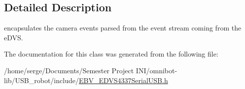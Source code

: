 \subsection{Detailed Description}
encapsulates the camera events parsed from the event stream coming from the e\+D\+V\+S. 

The documentation for this class was generated from the following file\+:\begin{DoxyCompactItemize}
\item 
/home/serge/\+Documents/\+Semester Project I\+N\+I/omnibot-\/lib/\+U\+S\+B\+\_\+robot/include/\hyperlink{_e_b_v___e_d_v_s4337_serial_u_s_b_8h}{E\+B\+V\+\_\+\+E\+D\+V\+S4337\+Serial\+U\+S\+B.\+h}\end{DoxyCompactItemize}
